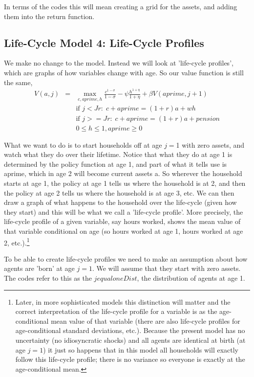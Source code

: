 In terms of the codes this will mean creating a grid for the assets, and adding them into the return function.

\subsection{Life-Cycle Model 4: Life-Cycle Profiles}
We make no change to the model. Instead we will look at 'life-cycle profiles', which are graphs of how variables change with age. So our value function is still the same,
\begin{eqnarray*}
 V(a,j)&=& \max_{c,aprime,h} \frac{c^{1-\sigma}}{1-\sigma} - \psi \frac{h^{1+\eta}}{1+\eta}  + \beta V(aprime,j+1) \\
&& \text{if }j<Jr: \; c+aprime=(1+r)a+w h \\
&& \text{if }j>=Jr: \; c+aprime=(1+r)a +pension\\
&& 0\leq h \leq 1, aprime\geq 0
\end{eqnarray*}

What we want to do is to start households off at age $j=$1 with zero assets, and watch what they do over their lifetime. Notice that what they do at age 1 is determined by the policy function at age 1, and part of what it tells use is aprime, which in age 2 will become current assets a. So wherever the household starts at age 1, the policy at age 1 tells us where the household is at 2, and then the policy at age 2 tells us where the household is at age 3, etc. We can then draw a graph of what happens to the household over the life-cycle (given how they start) and this will be what we call a 'life-cycle profile'. More precisely, the life-cycle profile of a given variable, say hours worked, shows the mean value of that variable conditional on age (so hours worked at age 1, hours worked at age 2, etc.).\footnote{Later, in more sophisticated models this distinction will matter and the correct interpretation of the life-cycle profile for a variable is as the age-conditional mean value of that variable (there are also life-cycle profiles for age-conditional standard deviations, etc.). Because the present model has no uncertainty (no idiosyncratic shocks) and all agents are identical at birth (at age $j=1$) it just so happens that in this model all households will exactly follow this life-cycle profile; there is no variance so everyone is exactly at the age-conditional mean.}

To be able to create life-cycle profiles we need to make an assumption about how agents are 'born' at age $j=1$. We will assume that they start with zero assets. The codes refer to this as the $jequaloneDist$, the distribution of agents at age 1.


